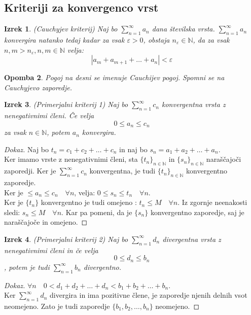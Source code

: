 \documentclass[11pt]{article}
\newtheorem{Izrek}{{\sc Izrek}}[section]
\newtheorem{Opomba}[Izrek]{{\sc Opomba}}
\newenvironment{dokaz}[1][{\sc Dokaz}]{\begin{proof}[#1]\renewcommand*{\qedsymbol}{\(\blacksquare\)}}{\end{proof}}
\begin{document}
\subsection{Kriteriji za konvergenco vrst}

\begin{Izrek}
 	(Cauchyjev kriterij) Naj bo $\sum_{n = 1}^{\infty}{a_n}$ dana številska vrsta. $\sum_{n = 1}^{\infty}{a_n}$ konvergira natanko tedaj kadar za vsak $\varepsilon > 0$, obstaja $n_\varepsilon \in \mathbb{N}$, da za vsak $n,m > n_\varepsilon, n,m\in \mathbb{N}$ velja:
 	$$ |a_m + a_{m+1} + \dots + a_n| < \varepsilon$$
\end{Izrek}
\begin{Opomba}
	Pogoj na desni se imenuje Cauchijev pogoj. Spomni se na Cauchyjevo zaporedje.
\end{Opomba}
\begin{Izrek}
	(Primerjalni kriterij 1) Naj bo $\sum_{n = 1}^{\infty}{c_n}$ konvergentna vrsta z nenegativnimi členi. Če velja $$0 \le a_n \le c_n$$ za vsak $n\in \mathbb{N}$, potem $a_n$ konvergira.
\end{Izrek}
\begin{dokaz}
	Naj bo $t_n = c_1 + c_2 + \dots + c_n$ in naj bo $s_n = a_1 + a_2 + \dots + a_n$.
	\\
	Ker imamo vrste z nenegativnimi členi, sta $\{t_n\}_{n\in \mathbb{N}}$ in $\{s_n\}_{n\in \mathbb{N}}$ naraščajoči zaporedji. Ker je $\sum_{n =1}^{\infty}{c_n}$ konvergentna, je tudi $\{t_n\}_{n\in \mathbb{N}}$ konvergentno zaporedje.
	\\
	Ker je $ \le a_n \le c_n \quad   \forall n$,  velja: $0 \le s_n \le t_n \quad \forall n$.
	\\ 
	Ker je $\{t_n\}$ konvergentno je tudi omejeno : $t_n \le M \quad \forall n$. Iz zgornje neenakosti sledi: $ s_n \le M \quad \forall n$. Kar pa pomeni, da je $\{s_n\}$ konvergentno zaporedje, saj je naraščajoče in omejeno.
\end{dokaz}
\begin{Izrek}
	(Primerjalni kriterij 2) Naj bo $\sum_{n = 1}^{\infty}{d_n}$ divergentna vrsta z nenegativnimi členi in če velja $$ 0 \le d_n \le b_n$$, potem je tudi $\sum_{n = 1}^{\infty}{b_n}$ divergentno.
\end{Izrek}
\begin{dokaz}
	$\forall n \quad  0 <d_1 + d_2 + \dots + d_n < b_1 + b_2 + \dots + b_n$.
	\\
	Ker $\sum_{n = 1}^{\infty}{d_n}$ divergira in ima pozitivne člene, je zaporedje njenih delnih vsot neomejeno. Zato je tudi zaporedje $\{b_1, b_2, \dots , b_n\}$ neomejeno.
\end{dokaz}
\end{document}

